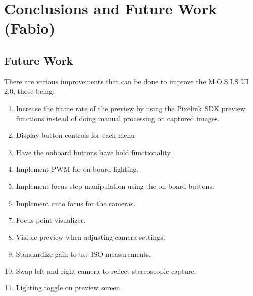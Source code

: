 \section{Conclusions and Future Work (Fabio)}

\subsection{Future Work}
There are various improvements that can be done to improve the M.O.S.I.S UI 2.0, those being:
\begin{enumerate}
	\item Increase the frame rate of the preview by using the Pixelink SDK preview functions instead of doing manual processing on captured images.
	\item Display button controls for each menu
	\item Have the onboard buttons have hold functionality.
	\item Implement PWM for on-board lighting.
	\item Implement focus step manipulation using the on-board buttons.
	\item Implement auto focus for the cameras.
	\item Focus point visualizer.
	\item Visible preview when adjusting camera settings.
	\item Standardize gain to use ISO measurements.
	\item Swap left and right camera to reflect stereoscopic capture.
	\item Lighting toggle on preview screen.
\end{enumerate}